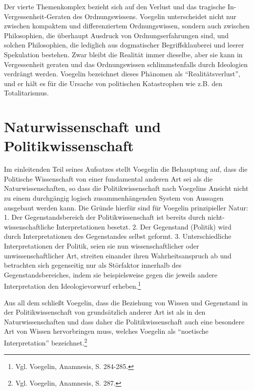Der vierte Themenkomplex bezieht sich auf den Verlust und das tragische
In-Vergessenheit-Geraten des Ordnungswissens. Voegelin unterscheidet
nicht nur zwischen kompaktem und differenziertem Ordnungswissen, sondern auch
zwischen Philosophien, die überhaupt Ausdruck von Ordnungserfahrungen sind,
und solchen Philosophien, die lediglich aus dogmatischer Begriffsklauberei
und leerer Spekulation bestehen. Zwar bleibt die Realität immer dieselbe,
aber sie kann in Vergessenheit geraten und das Ordnungswissen
schlimmstenfalls durch Ideologien verdrängt werden. Voegelin bezeichnet dieses
Phänomen als "`Realitätsverlust"', und er hält es für die Ursache von
politischen Katastrophen wie z.B. den Totalitarismus.


\section{Naturwissenschaft und Politikwissenschaft} 

Im einleitenden Teil seines Aufsatzes stellt Voegelin die Behauptung
auf, dass die Politische Wissenschaft von einer fundamental anderen Art
sei als die Naturwissenschaften, so dass die Politikwissenschaft nach
Voegelins Ansicht nicht zu einem durchgängig logisch zusammenhängenden
System von Aussagen ausgebaut werden kann.  Die Gründe hierfür sind für
Voegelin prinzipieller Natur: 1. Der Gegenstandsbereich der
Politikwissenschaft ist bereits durch nicht-wissenschaftliche
Interpretationen besetzt. 2. Der Gegenstand (Politik) wird durch
Interpretationen des Gegenstandes selbst geformt. 3.  Unterschiedliche
Interpretationen der Politik, seien sie nun wissenschaftlicher oder
unwissenschaftlicher Art, streiten einander ihren Wahrheitsanspruch ab
und betrachten sich gegenseitig nur als Störfaktor innerhalb des
Gegenstandsbereiches, indem sie beispielsweise gegen die jeweils andere
Interpretation den Ideologievorwurf erheben.\footnote{Vgl. Voegelin,
  Anamnesis, S. 284-285.}

Aus all dem schließt Voegelin, dass die Beziehung von Wissen und Gegenstand in
der Politikwissenschaft von grundsätzlich anderer Art ist als in den
Naturwissenschaften und dass daher die Politikwissenschaft auch eine besondere
Art von Wissen hervorbringen muss, welches Voegelin als "`noetische
Interpretation"' bezeichnet.\footnote{Vgl. Voegelin, Anamnesis, S. 287.}

